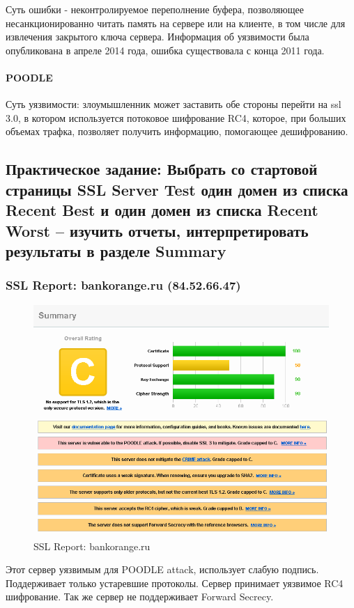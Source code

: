 \documentclass[12pt,a4paper]{article}
\begin{document}
Суть ошибки - неконтролируемое переполнение буфера, позволяющее несанкционированно читать память на сервере или на клиенте, в том числе для извлечения закрытого ключа сервера. Информация об уязвимости была опубликована в апреле 2014 года, ошибка существовала с конца 2011 года.


\paragraph{POODLE}
Суть уязвимости: злоумышленник может заставить обе стороны перейти на ssl 3.0, в котором используется потоковое шифрование RC4, которое, при больших объемах трафка, позволяет получить информацию, помогающее дешифрованию.


\subsection{Практическое задание: Выбрать со стартовой страницы SSL Server Test один домен из списка Recent Best и один домен из списка Recent Worst – изучить отчеты, интерпретировать результаты в разделе Summary}

\subsubsection{SSL Report: bankorange.ru (84.52.66.47)}
\begin{figure}[h!]
\centering
\includegraphics[scale=0.5]{2}
\caption{SSL Report: bankorange.ru}
\end{figure}
Этот сервер уязвимым для POODLE attack, использует слабую подпись. Поддерживает только устаревшие протоколы. Сервер принимает уязвимое RC4 шифрование. Так же сервер не поддерживает Forward Secrecy.
\end{document}
